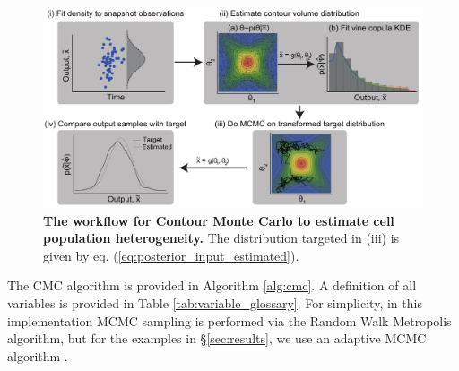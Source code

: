 \begin{figure}[H]
\label{fig:workflow}
\centerline{\includegraphics[width=\textwidth]{../figures/workflow.pdf}}
\caption{\textbf{The workflow for Contour Monte Carlo to estimate cell population heterogeneity.}
The distribution targeted in (iii) is given by eq. (\ref{eq:posterior_input_estimated}).}
\end{figure}

The CMC algorithm is provided in Algorithm \ref{alg:cmc}. A definition of all variables is provided in Table \ref{tab:variable_glossary}. For simplicity, in this implementation MCMC sampling is performed via the Random Walk Metropolis algorithm, but for the examples in \S \ref{sec:results}, we use an adaptive MCMC algorithm \cite{johnstone2016uncertainty}.

